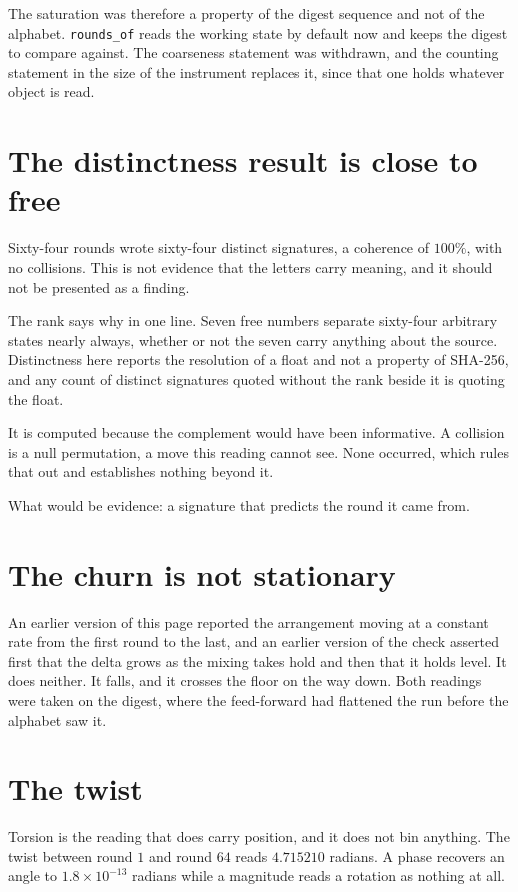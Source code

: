 The saturation was therefore a property of the digest sequence and not of the alphabet. \texttt{rounds\_of} reads the working state by default now and keeps the digest to compare against. The coarseness statement was withdrawn, and the counting statement in the size of the instrument replaces it, since that one holds whatever object is read.

\section{The distinctness result is close to free}

Sixty-four rounds wrote sixty-four distinct signatures, a coherence of \(100\%\), with no collisions. This is not evidence that the letters carry meaning, and it should not be presented as a finding.

The rank says why in one line. Seven free numbers separate sixty-four arbitrary states nearly always, whether or not the seven carry anything about the source. Distinctness here reports the resolution of a float and not a property of SHA-256, and any count of distinct signatures quoted without the rank beside it is quoting the float.

It is computed because the complement would have been informative. A collision is a null permutation, a move this reading cannot see. None occurred, which rules that out and establishes nothing beyond it.

What would be evidence: a signature that predicts the round it came from.

\section{The churn is not stationary}

An earlier version of this page reported the arrangement moving at a constant rate from the first round to the last, and an earlier version of the check asserted first that the delta grows as the mixing takes hold and then that it holds level. It does neither. It falls, and it crosses the floor on the way down. Both readings were taken on the digest, where the feed-forward had flattened the run before the alphabet saw it.

\section{The twist}

Torsion is the reading that does carry position, and it does not bin anything. The twist between round \(1\) and round \(64\) reads \(4.715210\) radians. A phase recovers an angle to \(1.8 \times 10^{-13}\) radians while a magnitude reads a rotation as nothing at all.

